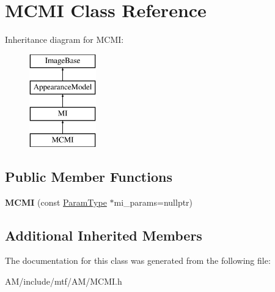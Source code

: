 \hypertarget{classMCMI}{\section{M\-C\-M\-I Class Reference}
\label{classMCMI}
}
Inheritance diagram for M\-C\-M\-I\-:\begin{figure}[H]
\begin{center}
\leavevmode
\includegraphics[height=4.000000cm]{classMCMI}
\end{center}
\end{figure}
\subsection*{Public Member Functions}
\begin{DoxyCompactItemize}
\item 
\hypertarget{classMCMI_a51f9c09ed2af390b3db3388ebd51ee2f}{{\bfseries M\-C\-M\-I} (const \hyperlink{structMIParams}{Param\-Type} $\ast$mi\-\_\-params=nullptr)}\label{classMCMI_a51f9c09ed2af390b3db3388ebd51ee2f}

\end{DoxyCompactItemize}
\subsection*{Additional Inherited Members}


The documentation for this class was generated from the following file\-:\begin{DoxyCompactItemize}
\item 
A\-M/include/mtf/\-A\-M/M\-C\-M\-I.\-h\end{DoxyCompactItemize}
